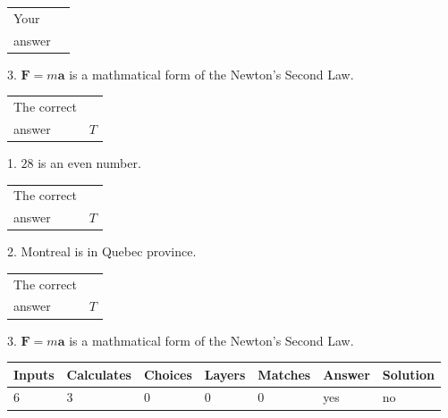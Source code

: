 \documentclass[12pt]{article}
\begin{document}
\noindent\begin{tabular}{|l|l|}\hline Your&\hspace{.2in} \\ answer&\hspace{.2in} \\ \hline \end{tabular}
3.  %
$\mathbf{F}=m\mathbf{a}$ is a mathmatical form of
the Newton's Second Law.
 
 
 
\noindent{}
 
 

 
\noindent\begin{tabular}{|l|l|}\hline The correct & \\
          answer &  %
$T$ \\ \hline \end{tabular}
1. $ %
28$ is an  %
even number.
 
\noindent\begin{tabular}{|l|l|}\hline The correct & \\
          answer &  %
$T$ \\ \hline \end{tabular}
2.  %
Montreal is in  %
Quebec province.
 
\noindent\begin{tabular}{|l|l|}\hline The correct & \\
          answer &  %
$T$ \\ \hline \end{tabular}
3.  %
$\mathbf{F}=m\mathbf{a}$ is a mathmatical form of  %
the Newton's Second Law.
 
 
 
\noindent{}
 
 

 
\vspace{0.3in}
   
   
   
   
\noindent\begin{tabular}{|l|l|l|l|l|l|l|}
 \hline
Inputs & Calculates & Choices & Layers & Matches & Answer & Solution \\ \hline
           6 & 
           3 & 
           0
  & 
           0 & 
           0 & 
  yes & 
  no 
  \\ \hline
 \end{tabular}
   
\end{document}
